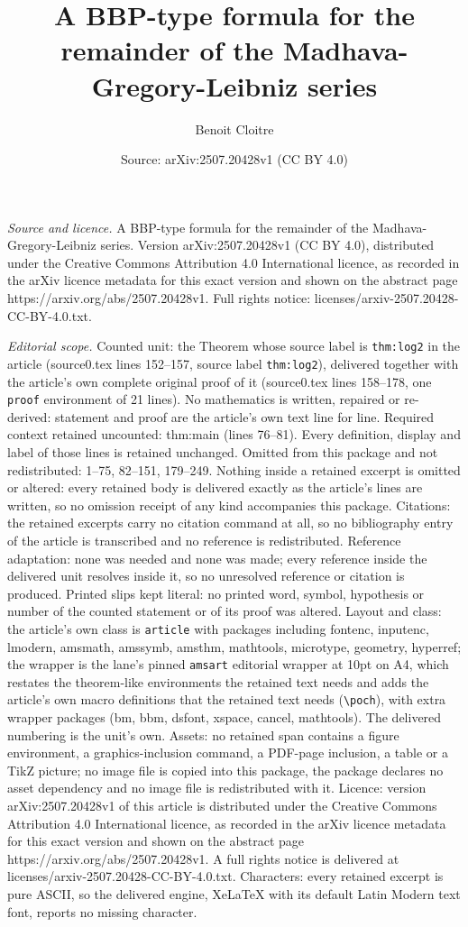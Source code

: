 \documentclass[10pt,a4paper]{amsart}
\title[A BBP-type formula for the remainder of the Madhava-Gregory-]{A BBP-type formula for the remainder of the Madhava-Gregory-Leibniz series}
\author{Benoit Cloitre}
\date{Source: arXiv:2507.20428v1 (CC BY 4.0)}
\begin{document}
\maketitle

\noindent\emph{Source and licence.} A BBP-type formula for the remainder of the Madhava-Gregory-Leibniz series. Version arXiv:2507.20428v1 (CC BY 4.0), distributed under the Creative Commons Attribution 4.0 International licence, as recorded in the arXiv licence metadata for this exact version and shown on the abstract page https://arxiv.org/abs/2507.20428v1. Full rights notice: licenses/arxiv-2507.20428-CC-BY-4.0.txt.\par\smallskip

\noindent\textit{Editorial scope.} Counted unit: the Theorem whose source label is \texttt{thm:log2} in the article (source0.tex lines 152--157, source label \texttt{thm:log2}), delivered together with the article's own complete original proof of it (source0.tex lines 158--178, one \texttt{proof} environment of 21 lines). No mathematics is written, repaired or re-derived: statement and proof are the article's own text line for line. Required context retained uncounted: thm:main (lines 76--81). Every definition, display and label of those lines is retained unchanged. Omitted from this package and not redistributed: 1--75, 82--151, 179--249. Nothing inside a retained excerpt is omitted or altered: every retained body is delivered exactly as the article's lines are written, so no omission receipt of any kind accompanies this package. Citations: the retained excerpts carry no citation command at all, so no bibliography entry of the article is transcribed and no reference is redistributed. Reference adaptation: none was needed and none was made; every reference inside the delivered unit resolves inside it, so no unresolved reference or citation is produced. Printed slips kept literal: no printed word, symbol, hypothesis or number of the counted statement or of its proof was altered. Layout and class: the article's own class is \texttt{article} with packages including fontenc, inputenc, lmodern, amsmath, amssymb, amsthm, mathtools, microtype, geometry, hyperref; the wrapper is the lane's pinned \texttt{amsart} editorial wrapper at 10pt on A4, which restates the theorem-like environments the retained text needs and adds the article's own macro definitions that the retained text needs (\texttt{\textbackslash poch}), with extra wrapper packages (bm, bbm, dsfont, xspace, cancel, mathtools). The delivered numbering is the unit's own. Assets: no retained span contains a figure environment, a graphics-inclusion command, a PDF-page inclusion, a table or a TikZ picture; no image file is copied into this package, the package declares no asset dependency and no image file is redistributed with it. Licence: version arXiv:2507.20428v1 of this article is distributed under the Creative Commons Attribution 4.0 International licence, as recorded in the arXiv licence metadata for this exact version and shown on the abstract page https://arxiv.org/abs/2507.20428v1. A full rights notice is delivered at licenses/arxiv-2507.20428-CC-BY-4.0.txt. Characters: every retained excerpt is pure ASCII, so the delivered engine, XeLaTeX with its default Latin Modern text font, reports no missing character.
\end{document}
